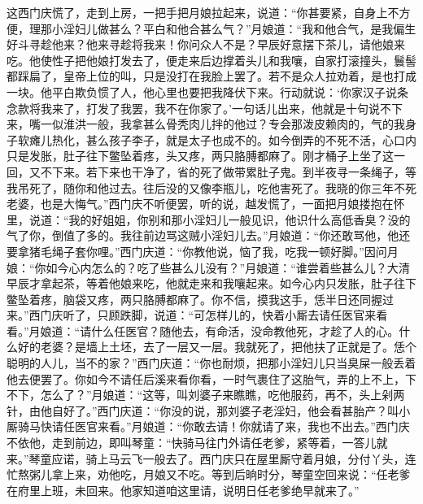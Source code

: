这西门庆慌了，走到上房，一把手把月娘拉起来，说道：“你甚要紧，自身上不方便，理那小淫妇儿做甚么？平白和他合甚么气？”月娘道：“我和他合气，是我偏生好斗寻趁他来？他来寻趁将我来！你问众人不是？早辰好意摆下茶儿，请他娘来吃。他使性子把他娘打发去了，便走来后边撑着头儿和我嚷，自家打滚撞头，鬟髻都踩扁了，皇帝上位的叫，只是没打在我脸上罢了。若不是众人拉劝着，是也打成一块。他平白欺负惯了人，他心里也要把我降伏下来。行动就说：‘你家汉子说条念款将我来了，打发了我罢，我不在你家了。’一句话儿出来，他就是十句说不下来，嘴一似淮洪一般，我拿甚么骨秃肉儿拌的他过？专会那泼皮赖肉的，气的我身子软瘫儿热化，甚么孩子李子，就是太子也成不的。如今倒弄的不死不活，心口内只是发胀，肚子往下鳖坠着疼，头又疼，两只胳膊都麻了。刚才桶子上坐了这一回，又不下来。若下来也干净了，省的死了做带累肚子鬼。到半夜寻一条绳子，等我吊死了，随你和他过去。往后没的又像李瓶儿，吃他害死了。我晓的你三年不死老婆，也是大悔气。”西门庆不听便罢，听的说，越发慌了，一面把月娘搂抱在怀里，说道：“我的好姐姐，你别和那小淫妇儿一般见识，他识什么高低香臭？没的气了你，倒值了多的。我往前边骂这贼小淫妇儿去。”月娘道：“你还敢骂他，他还要拿猪毛绳子套你哩。”西门庆道：“你教他说，恼了我，吃我一顿好脚。”因问月娘：“你如今心内怎么的？吃了些甚么儿没有？”月娘道：“谁尝着些甚么儿？大清早辰才拿起茶，等着他娘来吃，他就走来和我嚷起来。如今心内只发胀，肚子往下鳖坠着疼，脑袋又疼，两只胳膊都麻了。你不信，摸我这手，恁半日还同握过来。”西门庆听了，只顾跌脚，说道：“可怎样儿的，快着小厮去请任医官来看看。”月娘道：“请什么任医官？随他去，有命活，没命教他死，才趁了人的心。什么好的老婆？是墙上土坯，去了一层又一层。我就死了，把他扶了正就是了。恁个聪明的人儿，当不的家？”西门庆道：“你也耐烦，把那小淫妇儿只当臭屎一般丢着他去便罢了。你如今不请任后溪来看你看，一时气裹住了这胎气，弄的上不上，下不下，怎么了？”月娘道：“这等，叫刘婆子来瞧瞧，吃他服药，再不，头上剁两针，由他自好了。”西门庆道：“你没的说，那刘婆子老淫妇，他会看甚胎产？叫小厮骑马快请任医官来看。”月娘道：“你敢去请！你就请了来，我也不出去。”西门庆不依他，走到前边，即叫琴童：“快骑马往门外请任老爹，紧等着，一答儿就来。”琴童应诺，骑上马云飞一般去了。西门庆只在屋里厮守着月娘，分付丫头，连忙熬粥儿拿上来，劝他吃，月娘又不吃。等到后晌时分，琴童空回来说：“任老爹在府里上班，未回来。他家知道咱这里请，说明日任老爹绝早就来了。”

